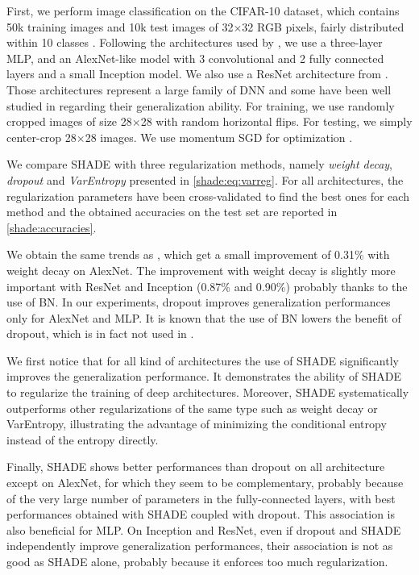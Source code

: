         First, we perform image classification on the CIFAR-10 dataset, which contains 50k training images and 10k test images of 32$\times$32 RGB pixels, fairly distributed within 10 classes \citep{cifar}. Following the architectures used by \citet{rethinking}, we use a three-layer \acf{MLP}, and an AlexNet-like model with 3 convolutional and 2 fully connected layers and a small Inception model. We also use a ResNet architecture from \citet{wideresnet}. Those architectures represent a large family of \ac{DNN} and some have been well studied in \citet{rethinking} regarding their generalization ability. For training, we use randomly cropped images of size 28$\times$28 with random horizontal flips. For testing, we simply center-crop 28$\times$28 images. We use momentum SGD for optimization \citep[same protocol as][]{rethinking}.
           
        We compare \ac{SHADE} with three regularization methods, namely {\em weight decay}, {\em dropout} and {\em VarEntropy} presented in \autoref{shade:eq:varreg}. For all architectures, the regularization parameters have been cross-validated to find the best ones for each method and the obtained accuracies on the test set are reported in \autoref{shade:accuracies}.
        
        We obtain the same trends as \citet{rethinking}, which get a small improvement of 0.31\% with weight decay on AlexNet. The improvement with weight decay is slightly more important with ResNet and Inception (0.87\% and 0.90\%) probably thanks to the use of \acf{BN}. In our experiments, dropout improves generalization performances only for AlexNet and \ac{MLP}. It is known that the use of \ac{BN} lowers the benefit of dropout, which is in fact not used in \citet{resnet}.
        
        We first notice that for all kind of architectures the use of \ac{SHADE} significantly improves the generalization performance. It demonstrates the ability of \ac{SHADE} to regularize the training of deep architectures. Moreover, \ac{SHADE} systematically outperforms other regularizations of the same type such as weight decay or VarEntropy, illustrating the advantage of minimizing the conditional entropy instead of the entropy directly. 
        
        Finally, \ac{SHADE} shows better performances than dropout on all architecture except on AlexNet, for which they seem to be complementary, probably because of the very large number of parameters in the fully-connected layers, with best performances obtained with \ac{SHADE} coupled with dropout. This association is also beneficial for \ac{MLP}. On Inception and ResNet, even if dropout and \ac{SHADE} independently improve generalization performances, their association is not as good as \ac{SHADE} alone, probably because it enforces too much regularization.
    

